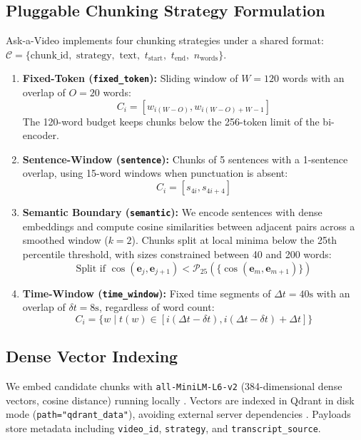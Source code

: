 \documentclass[conference]{IEEEtran}
\begin{document}
\subsection{Pluggable Chunking Strategy Formulation}
Ask-a-Video implements four chunking strategies under a shared format: $\mathcal{C} = \{\text{chunk\_id},$ $\text{strategy},$ $\text{text},$ $t_{\text{start}},$ $t_{\text{end}},$ $n_{\text{words}}\}$.
\begin{enumerate}
    \item \textbf{Fixed-Token (\texttt{fixed\_token}):} Sliding window of $W = 120$ words with an overlap of $O = 20$ words:
    \begin{equation}
    C_i = [w_{i(W-O)}, w_{i(W-O)+W-1}]
    \end{equation}
    The 120-word budget keeps chunks below the 256-token limit of the bi-encoder.
    \item \textbf{Sentence-Window (\texttt{sentence}):} Chunks of 5 sentences with a 1-sentence overlap, using 15-word windows when punctuation is absent:
    \begin{equation}
    C_i = [s_{4i}, s_{4i+4}]
    \end{equation}
    \item \textbf{Semantic Boundary (\texttt{semantic}):} We encode sentences with dense embeddings and compute cosine similarities between adjacent pairs across a smoothed window ($k=2$). Chunks split at local minima below the 25th percentile threshold, with sizes constrained between 40 and 200 words:
    \begin{equation}
    \text{Split if } \cos(\mathbf{e}_j, \mathbf{e}_{j+1}) < \mathcal{P}_{25}(\{\cos(\mathbf{e}_m, \mathbf{e}_{m+1})\})
    \end{equation}
    \item \textbf{Time-Window (\texttt{time\_window}):} Fixed time segments of $\Delta t = 40\text{s}$ with an overlap of $\delta t = 8\text{s}$, regardless of word count:
    \begin{equation}
    C_i = \{w \mid t(w) \in [i(\Delta t - \delta t), i(\Delta t - \delta t) + \Delta t]\}
    \end{equation}
\end{enumerate}

\subsection{Dense Vector Indexing}
We embed candidate chunks with \texttt{all-MiniLM-L6-v2} (384-dimensional dense vectors, cosine distance) running locally \cite{reimers2019sentence}. Vectors are indexed in Qdrant in disk mode (\texttt{path="qdrant\_data"}), avoiding external server dependencies \cite{qdrant2023}. Payloads store metadata including \texttt{video\_id}, \texttt{strategy}, and \texttt{transcript\_source}.
\end{document}
